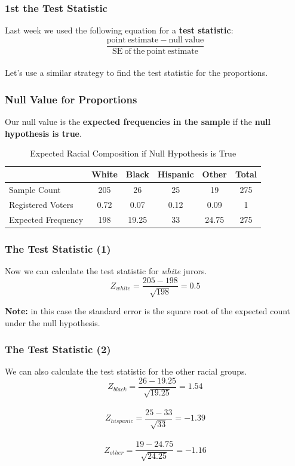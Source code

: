 \documentclass{beamer}\usepackage{graphicx, color}
\begin{document}

\begin{frame}[fragile]
  \frametitle{1st the Test Statistic}
  Last week we used the following equation for a {\bf{test statistic}}:
  \[
  \frac{\mathrm{point\:estimate} - \mathrm{null\:value}}{\mathrm{SE\:of\:the\:point\:estimate}}
  \] \\[0.5cm]
  Let's use a similar strategy to find the test statistic for the proportions.
\end{frame}


\begin{frame}[fragile]
  \frametitle{Null Value for Proportions}
  Our null value is the {\bf{expected frequencies in the sample}} if the {\bf{null hypothesis is true}}.
  \begin{table}
    \caption{Expected Racial Composition if Null Hypothesis is True}
    \begin{tabular}{l c c c c c}
    \hline
    & White & Black & Hispanic & Other & Total \\
    \hline\hline
    Sample Count & 205 & 26 & 25 & 19 & 275 \\ 
    Registered Voters & 0.72 & 0.07 & 0.12 & 0.09 & 1 \\ \hline
    Expected Frequency & 198 & 19.25 & 33 & 24.75 & 275 \\
    \hline
    \end{tabular}
  \end{table}
\end{frame}

\begin{frame}[fragile]
 \frametitle{The Test Statistic (1)}
 Now we can calculate the test statistic for {\emph{white}} jurors. \\[0.5cm]
 \[
 Z_{white} = \frac{205 - 198}{\sqrt{198}} = 0.5
 \]
 
 {\bf{Note:}} in this case the standard error is the square root of the expected count under the null hypothesis.
\end{frame}

\begin{frame}[fragile]
 \frametitle{The Test Statistic (2)}
 We can also calculate the test statistic for the other racial groups. \\[0.5cm]
 \[
 Z_{black} = \frac{26 - 19.25}{\sqrt{19.25}} = 1.54
 \] \\[0.3cm]
  \[
 Z_{hispanic} = \frac{25 - 33}{\sqrt{33}} = -1.39
 \]\\[0.3cm]
  \[
 Z_{other} = \frac{19 - 24.75}{\sqrt{24.25}} = -1.16
 \]\\[0.3cm]
\end{frame}
\end{document}
